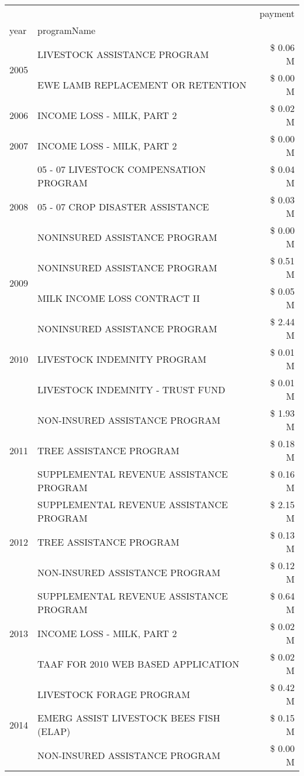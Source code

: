 \begin{tabular}{llr}
\toprule
 &  & payment \\
year & programName &  \\
\midrule
\multirow[t]{2}{*}{2005} & LIVESTOCK ASSISTANCE PROGRAM & \$ 0.06 M \\
 & EWE LAMB REPLACEMENT OR RETENTION & \$ 0.00 M \\
\cline{1-3}
2006 & INCOME LOSS - MILK, PART 2 & \$ 0.02 M \\
\cline{1-3}
2007 & INCOME LOSS - MILK, PART 2 & \$ 0.00 M \\
\cline{1-3}
\multirow[t]{3}{*}{2008} & 05 - 07 LIVESTOCK COMPENSATION PROGRAM & \$ 0.04 M \\
 & 05 - 07 CROP DISASTER ASSISTANCE & \$ 0.03 M \\
 & NONINSURED ASSISTANCE PROGRAM & \$ 0.00 M \\
\cline{1-3}
\multirow[t]{2}{*}{2009} & NONINSURED ASSISTANCE PROGRAM & \$ 0.51 M \\
 & MILK INCOME LOSS CONTRACT II & \$ 0.05 M \\
\cline{1-3}
\multirow[t]{3}{*}{2010} & NONINSURED ASSISTANCE PROGRAM & \$ 2.44 M \\
 & LIVESTOCK INDEMNITY PROGRAM & \$ 0.01 M \\
 & LIVESTOCK INDEMNITY - TRUST FUND & \$ 0.01 M \\
\cline{1-3}
\multirow[t]{3}{*}{2011} & NON-INSURED ASSISTANCE PROGRAM & \$ 1.93 M \\
 & TREE ASSISTANCE PROGRAM & \$ 0.18 M \\
 & SUPPLEMENTAL REVENUE ASSISTANCE PROGRAM & \$ 0.16 M \\
\cline{1-3}
\multirow[t]{3}{*}{2012} & SUPPLEMENTAL REVENUE ASSISTANCE PROGRAM & \$ 2.15 M \\
 & TREE ASSISTANCE PROGRAM & \$ 0.13 M \\
 & NON-INSURED ASSISTANCE PROGRAM & \$ 0.12 M \\
\cline{1-3}
\multirow[t]{3}{*}{2013} & SUPPLEMENTAL REVENUE ASSISTANCE PROGRAM & \$ 0.64 M \\
 & INCOME LOSS - MILK, PART 2 & \$ 0.02 M \\
 & TAAF FOR 2010 WEB BASED APPLICATION & \$ 0.02 M \\
\cline{1-3}
\multirow[t]{3}{*}{2014} & LIVESTOCK FORAGE PROGRAM & \$ 0.42 M \\
 & EMERG ASSIST LIVESTOCK BEES FISH (ELAP) & \$ 0.15 M \\
 & NON-INSURED ASSISTANCE PROGRAM & \$ 0.00 M \\

\end{tabular}
